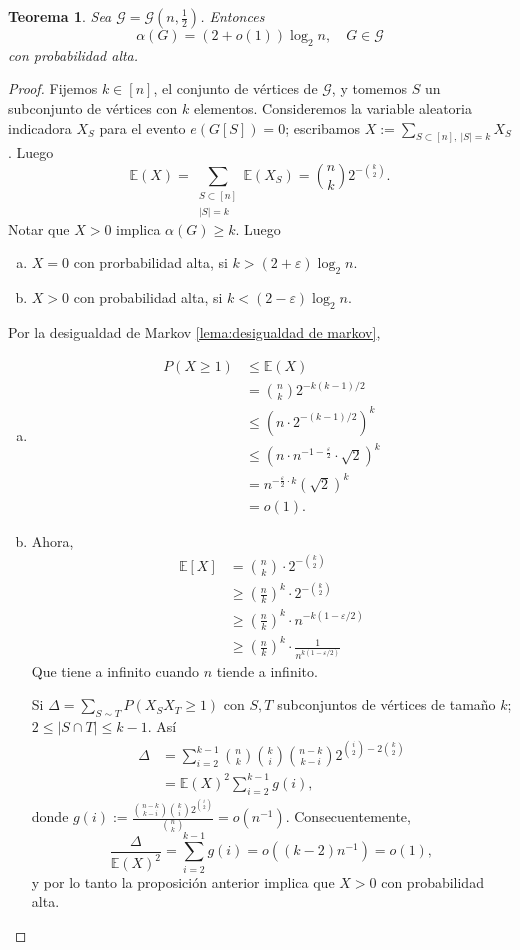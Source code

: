 \documentclass[12pt]{report}
\theoremstyle{plain}
\newtheorem{theorem}{Teorema}[section]
\theoremstyle{definition}
\newcommand{\abs}[1]{\left \vert #1 \right \vert}
\begin{document}
\begin{theorem}
Sea $\mathcal G = \mathcal G (n, \frac 1 2)$. Entonces
\[
    \alpha (G) = (2 + o(1)) \log_2 n, \quad G \in \mathcal G
\]
con probabilidad alta.
\end{theorem}
\begin{proof}
Fijemos $k \in [n]$, el conjunto de vértices de $\mathcal G$, y tomemos $S$ un subconjunto de vértices con $k$ elementos. Consideremos la variable aleatoria indicadora $X_S$ para el evento $e(G[S]) = 0$; escribamos $X := \sum_{S \subset [n], \: \abs S = k} X_S$. Luego
\[
    \mathbb{E}  (X) = \sum_{\substack{S \subset [n] \\ \abs{S} = k}} \mathbb{E}(X_S)  = \binom n k 2^{- \binom k 2}.
\]
Notar que $X > 0$ implica $\alpha (G) \geq k$. Luego
\begin{enumerate}[(a)]
\item $X = 0$ con prorbabilidad alta, si $k > (2 + \varepsilon) \log_2 n$.
\item $X > 0$ con probabilidad alta, si $k < (2- \varepsilon) \log _2 n$.
\end{enumerate}
Por la desigualdad de Markov \ref{lema:desigualdad de markov},
\begin{enumerate}[(a)]
\item
\begin{align*}
P(X \geq 1) &\leq \mathbb{E} (X ) \\
&= \binom n k 2^{-k (k-1)/2} \\
&\leq \left ( n \cdot 2^{- (k-1)/2} \right)^k \\
&\leq \left ( n \cdot n^{-1 - \frac \varepsilon 2} \cdot \sqrt 2 \right )^k \\
&= n^{-\frac \varepsilon 2 \cdot k} (\sqrt 2 )^k \\
&= o(1).
\end{align*}
\item Ahora,
\begin{align*}
\mathbb{E}[X] &= \binom n k \cdot 2^{- \binom k 2} \\
&\geq \left ( \frac n k \right )^k \cdot 2^{- \binom k 2} \\
& \geq \left ( \frac n k \right )^k \cdot n^{-k ( 1 - \varepsilon /2)} \\
& \geq \left ( \frac n k \right )^k \cdot \frac{1}{n^{k ( 1 - \varepsilon /2)}}
\end{align*}
Que tiene a infinito cuando $n$ tiende a infinito.

Si $\Delta = \sum_{S \sim T} P (X_S X_T \geq 1)$ con $S,T$ subconjuntos de vértices de tamaño $k$; $2 \leq \abs{S \cap T} \leq k-1$. Así
\begin{align*}
\Delta &= \sum_{i = 2}^{k-1} \binom n k \binom k i \binom {n-k}{k-i} 2^{\binom i 2 - 2 \binom k 2} \\
&= \mathbb{E}(X)^2 \sum_{i = 2}^{k-1} g (i),
\end{align*}
donde $g(i) := \frac{\binom {n-k}{k-i} \binom k i 2^{\binom i 2}}{\binom n k} = o(n^{-1})$.
Consecuentemente,
\[
    \frac{\Delta}{\mathbb{E}(X)^2} = \sum_{i = 2}^{k-1} g(i) = o ((k-2) n^{-1} )= o(1),
\]
y por lo tanto la proposición anterior implica que $X > 0$ con probabilidad alta.
\end{enumerate}


\end{proof}
\end{document}

